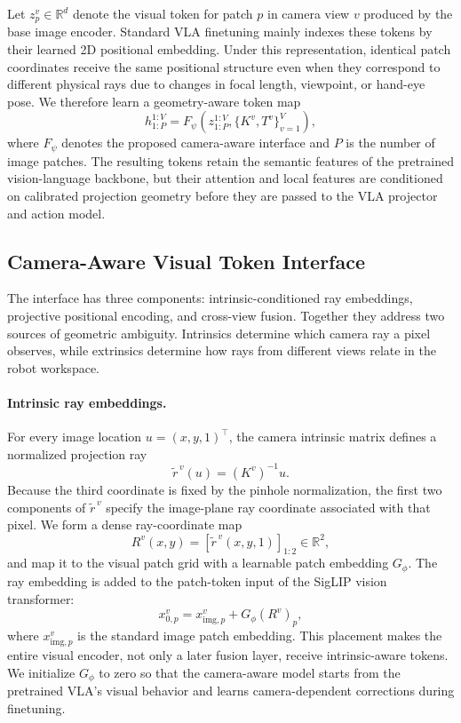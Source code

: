 \documentclass{article}
\begin{document}
Let $z_p^v\in\mathbb{R}^d$ denote the visual token for patch $p$ in camera view $v$ produced by the base image encoder. Standard VLA finetuning mainly indexes these tokens by their learned 2D positional embedding. Under this representation, identical patch coordinates receive the same positional structure even when they correspond to different physical rays due to changes in focal length, viewpoint, or hand-eye pose. We therefore learn a geometry-aware token map
\begin{equation}
    h_{1:P}^{1:V} = F_\psi\left(z_{1:P}^{1:V}, \{K^v,T^v\}_{v=1}^{V}\right),
\end{equation}
where $F_\psi$ denotes the proposed camera-aware interface and $P$ is the number of image patches. The resulting tokens retain the semantic features of the pretrained vision-language backbone, but their attention and local features are conditioned on calibrated projection geometry before they are passed to the VLA projector and action model.

\subsection{Camera-Aware Visual Token Interface}
The interface has three components: intrinsic-conditioned ray embeddings, projective positional encoding, and cross-view fusion. Together they address two sources of geometric ambiguity. Intrinsics determine which camera ray a pixel observes, while extrinsics determine how rays from different views relate in the robot workspace.

\paragraph{Intrinsic ray embeddings.}
For every image location $u=(x,y,1)^\top$, the camera intrinsic matrix defines a normalized projection ray
\begin{equation}
    \tilde{r}^{\,v}(u) = (K^v)^{-1} u .
\end{equation}
Because the third coordinate is fixed by the pinhole normalization, the first two components of $\tilde{r}^{\,v}$ specify the image-plane ray coordinate associated with that pixel. We form a dense ray-coordinate map
\begin{equation}
    R^v(x,y)=\left[\tilde{r}^{\,v}(x,y,1)\right]_{1:2}\in\mathbb{R}^{2},
\end{equation}
and map it to the visual patch grid with a learnable patch embedding $G_\phi$. The ray embedding is added to the patch-token input of the SigLIP vision transformer:
\begin{equation}
    x_{0,p}^v = x_{\mathrm{img},p}^v + G_\phi(R^v)_p ,
\end{equation}
where $x_{\mathrm{img},p}^v$ is the standard image patch embedding. This placement makes the entire visual encoder, not only a later fusion layer, receive intrinsic-aware tokens. We initialize $G_\phi$ to zero so that the camera-aware model starts from the pretrained VLA's visual behavior and learns camera-dependent corrections during finetuning.
\end{document}
